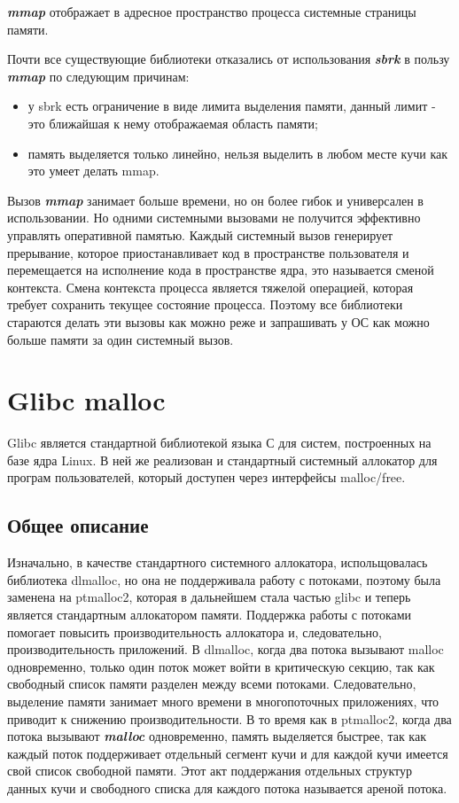 \textbf{\textit{mmap}} отображает в адресное пространство процесса системные страницы памяти.

Почти все существующие библиотеки отказались от использования \textbf{\textit{sbrk}} в пользу \textbf{\textit{mmap}} по следующим причинам:
\begin{itemize}
	\item у sbrk есть ограничение в виде лимита выделения памяти, данный лимит - это ближайшая к нему отображаемая область памяти;
	\item память выделяется только линейно, нельзя выделить в любом месте кучи как это умеет делать mmap.
\end{itemize}

Вызов \textbf{\textit{mmap}} занимает больше времени, но он более гибок и универсален в использовании. Но одними системными вызовами не получится эффективно управлять оперативной памятью. Каждый системный вызов генерирует прерывание, которое приостанавливает код в пространстве пользователя и перемещается   на исполнение кода в пространстве  ядра, это называется сменой контекста. Смена контекста процесса является тяжелой операцией, которая требует сохранить текущее состояние процесса. Поэтому все библиотеки стараются делать эти вызовы как можно реже и запрашивать у ОС как можно больше памяти за один системный вызов.

\section{Glibc malloc}
Glibc является стандартной библиотекой языка С для систем, построенных на базе ядра Linux. В ней же реализован и стандартный системный аллокатор для програм пользователей, который доступен через интерфейсы malloc/free.

\subsection{Общее описание}
Изначально, в качестве стандартного системного аллокатора, испольщовалась библиотека dlmalloc, но она не поддерживала работу с потоками, поэтому была заменена на ptmalloc2, которая в дальнейшем стала частью glibc и теперь является стандартным аллокатором памяти. Поддержка работы с потоками помогает повысить производительность аллокатора и, следовательно, производительность приложений. В dlmalloc, когда два потока вызывают malloc одновременно, только один поток может войти в критическую секцию, так как свободный список памяти разделен между всеми потоками. Следовательно, выделение памяти занимает много времени в многопоточных приложениях, что приводит к снижению производительности. В то время как в ptmalloc2, когда два потока вызывают \textbf{\textit{malloc}} одновременно, память выделяется быстрее, так как каждый поток поддерживает отдельный сегмент кучи и для каждой кучи имеется свой список свободной памяти. Этот акт поддержания отдельных структур данных кучи и свободного списка для каждого потока называется ареной потока.

